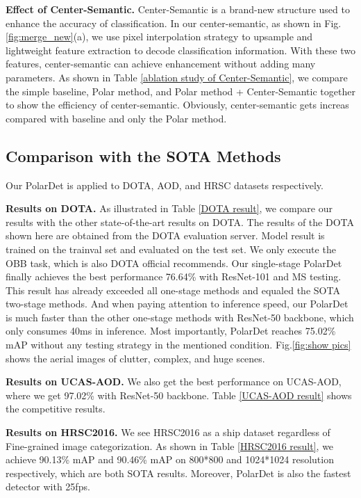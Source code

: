 \documentclass[10pt,twocolumn]{article}
\begin{document}
\textbf{Effect of Center-Semantic.} Center-Semantic is a brand-new structure used to enhance the accuracy of classification. In our center-semantic, as shown in Fig.\ref{fig:merge_new}(a), we use pixel interpolation strategy to upsample and lightweight feature extraction to decode classification information. With these two features, center-semantic can achieve enhancement without adding many parameters. As shown in Table \ref{ablation study of Center-Semantic}, we compare the simple baseline, Polar method, and Polar method + Center-Semantic together to show the efficiency of center-semantic. Obviously, center-semantic gets increas compared with baseline and only the Polar method.

\subsection{Comparison with the SOTA Methods}\label{comp}

Our PolarDet is applied to DOTA, AOD, and HRSC datasets respectively.

\textbf{Results on DOTA.} As illustrated in Table \ref{DOTA result}, we compare our results with the other state-of-the-art results on DOTA. The results of the DOTA shown here are obtained from the DOTA evaluation server. Model result is trained on the trainval set and evaluated on the test set. We only execute the OBB task, which is also DOTA official recommends. Our single-stage PolarDet finally achieves the best performance 76.64\% with ResNet-101 and MS testing. This result has already exceeded all one-stage methods and equaled the SOTA two-stage methods. And when paying attention to inference speed, our PolarDet is much faster than the other one-stage methods with ResNet-50 backbone, which only consumes 40ms in inference. Most importantly, PolarDet reaches 75.02\% mAP without any testing strategy in the mentioned condition. Fig.\ref{fig:show pics} shows the aerial images of clutter, complex, and huge scenes.



\textbf{Results on UCAS-AOD.} We also get the best performance on UCAS-AOD, where we get 97.02\% with ResNet-50 backbone. Table \ref{UCAS-AOD result} shows the competitive results.

\textbf{Results on HRSC2016.} We see HRSC2016 as a ship dataset regardless of Fine-grained image categorization. As shown in Table \ref{HRSC2016 result}, we achieve 90.13\% mAP and 90.46\% mAP on 800*800 and 1024*1024 resolution respectively, which are both SOTA results. Moreover, PolarDet is also the fastest detector with 25fps.
\end{document}
